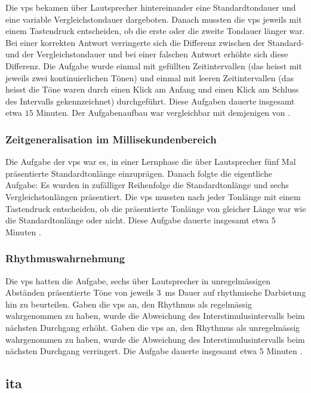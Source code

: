\documentclass[11pt, twoside, a4paper]{book}		%
\begin{document}
Die \glspl{vp} bekamen über Lautsprecher hintereinander eine Standardtondauer und eine variable Vergleichstondauer dargeboten. Danach mussten die \glspl{vp} jeweils mit einem Tastendruck entscheiden, ob die erste oder die zweite Tondauer länger war. Bei einer korrekten Antwort verringerte sich die Differenz zwischen der Standard- und der Vergleichstondauer und bei einer falschen Antwort erhöhte sich diese Differenz. Die Aufgabe wurde einmal mit gefüllten Zeitintervallen (das heisst mit jeweils zwei kontinuierlichen Tönen) und einmal mit leeren Zeitintervallen (das heisst die Töne waren durch einen Klick am Anfang und einen Klick am Schluss des Intervalls gekennzeichnet) durchgeführt. Diese Aufgaben dauerte insgesamt etwa $15$ Minuten. Der Aufgabenaufbau war vergleichbar mit demjenigen von \citet{Stauffer2011}. 


\subsubsection*{Zeitgeneralisation im Millisekundenbereich}

Die Aufgabe der \glspl{vp} war es, in einer Lernphase die über Lautsprecher fünf Mal präsentierte Standardtonlänge einzuprägen. Danach folgte die eigentliche Aufgabe: Es wurden in zufälliger Reihenfolge die Standardtonlänge und sechs Vergleichstonlängen präsentiert. Die \glspl{vp} mussten nach jeder Tonlänge mit einem Tastendruck entscheiden, ob die präsentierte Tonlänge von gleicher Länge war wie die Standardtonlänge oder nicht. Diese Aufgabe dauerte insgesamt etwa $5$ Minuten \citep[siehe][]{Stauffer2011}.

\subsubsection*{Rhythmuswahrnehmung}

Die \glspl{vp} hatten die Aufgabe, sechs über Lautsprecher in unregelmässigen Abständen präsentierte Töne von jeweils $3$~ms Dauer auf rhythmische Darbietung hin zu beurteilen. 
Gaben die \glspl{vp} an, den Rhythmus als regelmässig wahrgenommen zu haben, wurde die Abweichung des Interstimulusintervalls beim nächsten Durchgang erhöht. Gaben die \glspl{vp} an, den Rhythmus als unregelmässig wahrgenommen zu haben, wurde die Abweichung des Interstimulusintervalls beim nächsten Durchgang verringert.
Die Aufgabe dauerte insgesamt etwa $5$ Minuten \citep[siehe][]{Stauffer2011}.

\subsection{\gls{ita}}
\end{document}
